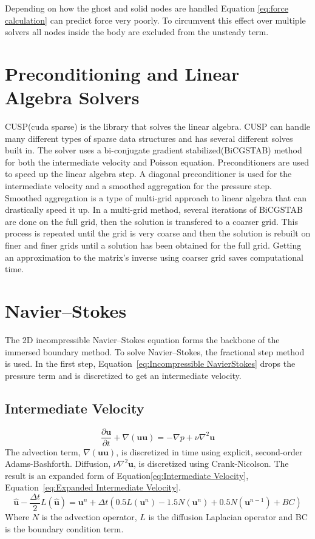 \documentclass[onehalf,11pt]{beavtex}
\begin{document}
Depending on how the ghost and solid nodes are handled Equation \eqref{eq:force calculation} can predict force very poorly.
To circumvent this effect over multiple solvers all nodes inside the body are excluded from the unsteady term.

\section{Preconditioning and Linear Algebra Solvers}
\label{Preconditioning and Linear Algebra Solvers}
CUSP(cuda sparse) is the library that solves the linear algebra.
CUSP can handle many different types of sparse data structures and has several different solves built in.
The solver uses a bi-conjugate gradient stabilized(BiCGSTAB) method for both the intermediate velocity and Poisson equation.
Preconditioners are used to speed up the linear algebra step.
A diagonal preconditioner is used for the intermediate velocity and a smoothed aggregation for the pressure step.
Smoothed aggregation is a type of multi-grid approach to linear algebra that can drastically speed it up.
In a multi-grid method, several iterations of BiCGSTAB are done on the full grid, then the solution is transfered to a coarser grid.
This process is repeated until the grid is very coarse and then the solution is rebuilt on finer and finer grids until a solution has been obtained for the full grid.
Getting an approximation to the matrix's inverse using coarser grid saves computational time.
\section{Navier--Stokes}
\label{ID:Navier Stokes}

The 2D incompressible Navier--Stokes equation forms the backbone of the immersed boundary method.
To solve Navier--Stokes, the fractional step method is used.
In the first step, Equation~\eqref{eq:Incompressible NavierStokes} drops the pressure term and is discretized to get an intermediate velocity.

\subsection{Intermediate Velocity}
\label{ID:NS intermediate velocity}
\begin{equation}
\frac{\partial \textbf{u}}{\partial t} + \nabla ( \textbf{uu} ) = -\nabla p + \nu\nabla^{2}\textbf{u} \label{eq:Incompressible NavierStokes}
\end{equation}
The advection term, $\nabla (\textbf{uu})$, is discretized in time using explicit, second-order Adams-Bashforth.
Diffusion, $\nu \nabla^2 \textbf{u}$, is discretized using Crank-Nicolson.
The result is an expanded form of Equation\eqref{eq:Intermediate Velocity}, Equation~\eqref{eq:Expanded Intermediate Velocity}.
\begin{equation}
\label{eq:Expanded Intermediate Velocity}
\hat{\textbf{u}} - \frac{\Delta t}{2}L(\hat{\textbf{u}}) = \textbf{u}^n + \Delta t\left(0.5L(\textbf{u}^n) - 1.5N(\textbf{u}^n) + 0.5N(\textbf{u}^{n-1}) + BC\right)
\end{equation}
Where $N$ is the advection operator, $L$ is the diffusion Laplacian operator and BC is the boundary condition term.
\end{document}
